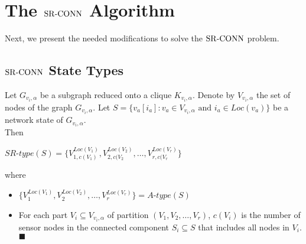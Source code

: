 \begin{enumerate}
\end{enumerate}






\section{The ${\mathrm {SR\mbox{-}CONN}}$ Algorithm}
\label{sec:sralg}
Next, we present the needed modifications to solve the ${\mathrm {SR\mbox{-}CONN}}$ problem.
\subsection{${\mathrm {SR\mbox{-}CONN}}$ State Types}
\label{subsec:srst}

\begin{definition}\label{def:srst}
Let $G_{v_i,\alpha}$ be a subgraph reduced onto a clique $K_{v_i,\alpha}$. Denote by $V_{v_i,\alpha}$ the set of nodes of the graph $G_{v_i,\alpha}$. Let $S=\{v_a[i_a] :v_a\in V_{v_i,\alpha} \mbox{ and } i_a \in Loc(v_a)\}$  be a network state of $G_{v_i,\alpha}$.\\
Then
\nwline
\centerline{
$SR\mbox{-}type(S)=\{V_{1,c(V_1)}^{Loc(V_1)}, V_{2,c(V_2}^{Loc(V_2)}, \ldots, V^{Loc(V_r)}_{r,c(V_r} \}$}

where
\begin{itemize}[noitemsep]
\item $\{V_1^{Loc(V_1)}, V_2^{Loc(V_2)}, \ldots, V_r^{Loc(V_r)}\}=A\mbox{-}type(S)$
\item For each part $V_i\subseteq V_{v_i,\alpha}$ of partition $(V_1,V_2,\ldots,V_r)$, $c(V_i)$ is the number of sensor nodes in the connected component $S_i \subseteq S$  that includes all nodes in $V_i$.
 $\blacksquare$
\end{itemize}
\end{definition}

